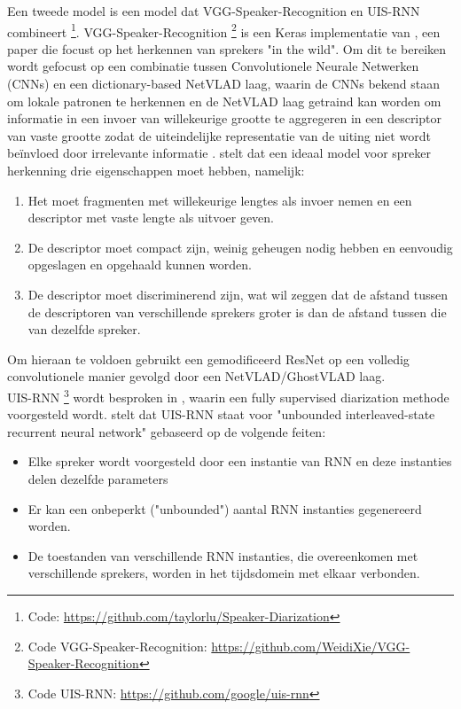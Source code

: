 Een tweede model is een model dat VGG-Speaker-Recognition en UIS-RNN combineert \footnote{Code: \url{https://github.com/taylorlu/Speaker-Diarization}}. VGG-Speaker-Recognition \footnote{Code VGG-Speaker-Recognition: \url{https://github.com/WeidiXie/VGG-Speaker-Recognition}} is een Keras implementatie van \textcite{Xie2019}, een paper die focust op het herkennen van sprekers "in the wild". Om dit te bereiken wordt gefocust op een combinatie tussen Convolutionele Neurale Netwerken (CNNs) en een dictionary-based NetVLAD laag, waarin de CNNs bekend staan om lokale patronen te herkennen en de NetVLAD laag getraind kan worden om informatie in een invoer van willekeurige grootte te aggregeren in een descriptor van vaste grootte zodat de uiteindelijke representatie van de uiting niet wordt beïnvloed door irrelevante informatie \autocite{Xie2019}.
\textcite{Xie2019} stelt dat een ideaal model voor spreker herkenning drie eigenschappen moet hebben, namelijk:
\begin{enumerate}
	\item Het moet fragmenten met willekeurige lengtes als invoer nemen en een descriptor met vaste lengte als uitvoer geven.
	\item De descriptor moet compact zijn, weinig geheugen nodig hebben en eenvoudig opgeslagen en opgehaald kunnen worden.
	\item De descriptor moet discriminerend zijn, wat wil zeggen dat de afstand tussen de descriptoren van verschillende sprekers groter is dan de afstand tussen die van dezelfde spreker.
\end{enumerate}
Om hieraan te voldoen gebruikt \textcite{Xie2019} een gemodificeerd ResNet op een volledig convolutionele manier gevolgd door een NetVLAD/GhostVLAD laag.\\
UIS-RNN \footnote{Code UIS-RNN: \url{https://github.com/google/uis-rnn}} wordt besproken in \textcite{Zhang2018}, waarin een fully supervised diarization methode voorgesteld wordt. \textcite{Zhang2018} stelt dat UIS-RNN staat voor "unbounded interleaved-state recurrent neural network" gebaseerd op de volgende feiten:
\begin{itemize}
	\item Elke spreker wordt voorgesteld door een instantie van RNN en deze instanties delen dezelfde parameters
	\item Er kan een onbeperkt ("unbounded") aantal RNN instanties gegenereerd worden.
	\item De toestanden van verschillende RNN instanties, die overeenkomen met verschillende sprekers, worden in het tijdsdomein met elkaar verbonden.
\end{itemize}

